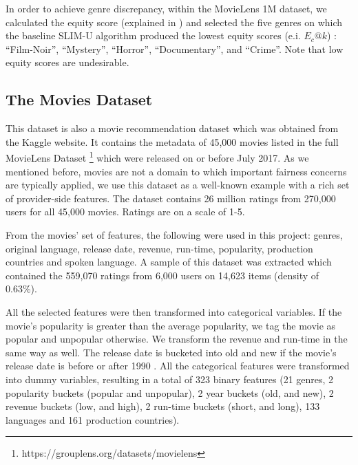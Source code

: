         In order to achieve genre discrepancy, within the MovieLens 1M dataset, we calculated the equity score (explained in ) and selected the five genres on which the baseline SLIM-U algorithm produced the lowest equity scores (e.i. $E_c@k$) : ``Film-Noir'', ``Mystery'', ``Horror'', ``Documentary'', and ``Crime''. Note that low equity scores are undesirable.
        



    \subsection{The Movies Dataset}
    
    This dataset is also a movie recommendation dataset which was obtained from the Kaggle website. It contains the metadata of 45,000 movies listed in the full MovieLens Dataset \footnote{https://grouplens.org/datasets/movielens} which were released on or before July 2017. As we mentioned before, movies are not a domain to which important fairness concerns are typically applied, we use this dataset as a well-known example with a rich set of provider-side features. The dataset contains 26 million ratings from 270,000 users for all 45,000 movies. Ratings are on a scale of 1-5.
    
    From the movies' set of features, the following were used in this project: genres, original language, release date, revenue, run-time, popularity, production countries and spoken language. A sample of this dataset was extracted which contained the 559,070 ratings from 6,000 users on 14,623 items (density of 0.63\%).

    All the selected features were then transformed into categorical variables. If the movie's popularity is greater than the average popularity, we tag the movie as popular and unpopular otherwise. We transform the revenue and run-time in the same way as well. The release date is bucketed into old and new if the movie's release date is before or after 1990 \cite{kamishima2016model}. All the categorical features were transformed into dummy variables, resulting in a total of 323 binary features (21 genres, 2 popularity buckets (popular and unpopular), 2 year buckets (old, and new), 2 revenue buckets (low, and high), 2 run-time buckets (short, and long), 133 languages and 161 production countries).
    
